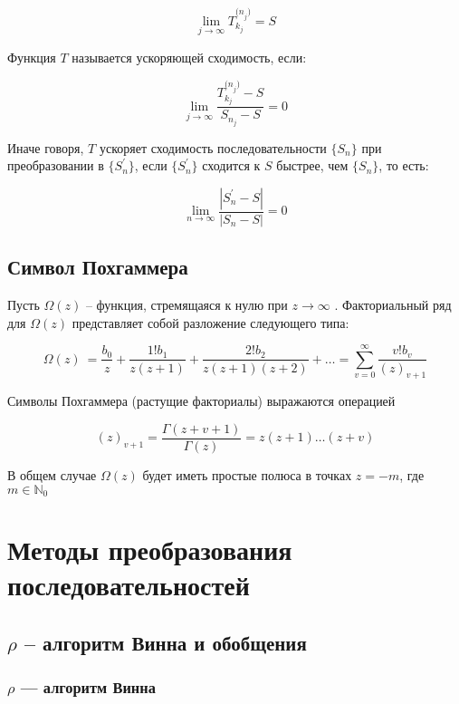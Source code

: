 \documentclass[14pt, a4paper]{extarticle}
\theoremstyle{definition}
\theoremstyle{remark}
\begin{document}
\[\lim_{j \rightarrow \infty}T_{k_{j}}^{{(n}_{j})} = S\]

Функция \(T\) называется ускоряющей сходимость, если:

\[\lim_{j \rightarrow \infty}\frac{T_{k_{j}}^{{(n}_{j})} - S}{S_{n_{j}} - S} = 0\]

Иначе говоря, \(T\) ускоряет сходимость последовательности
\(\{ S_{n}\}\) при преобразовании в \(\{ S_{n}^{'}\}\), если
\(\{ S_{n}^{'}\}\) сходится к \(S\) быстрее, чем \(\{ S_{n}\}\), то
есть:

\[\lim_{n \rightarrow \infty}\frac{\left| S_{n}^{'} - S \right|}{\left| S_{n} - S \right|} = 0\]

\subsection*{Символ Похгаммера}

Пусть \(\Omega(z)\) -- функция, стремящаяся к нулю при \(z \to\infty \) .
Факториальный ряд для \(\Omega(z)\) представляет собой разложение
следующего типа:

\[\Omega(z)\  = \frac{b_{0}}{z} + \frac{1!b_{1}}{z(z + 1)} + \frac{2!b_{2}}{z(z + 1)(z + 2)} + \ldots = \sum_{v = 0}^{\infty}\frac{v!b_{v}}{{(z)}_{v + 1}}\]

Символы Похгаммера (растущие факториалы) выражаются операцией

\[{(z)}_{v + 1} = \frac{\Gamma(z + v + 1)}{\Gamma(z)} = z(z + 1)\ldots(z + v)\]

В общем случае \(\Omega(z)\) будет иметь простые полюса в точках \(z =
-m\), где \(m \in \mathbb{N}_{0}\)



\section{Методы преобразования
последовательностей}


\subsection{\(\rho\) -- алгоритм Винна и обобщения}

\subsubsection*{\(\rho\) — алгоритм Винна}
\end{document}
